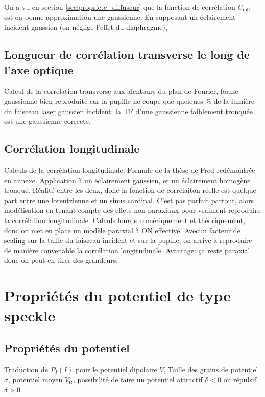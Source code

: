On a vu en section \ref{sec:propriete_diffuseur} que la fonction de corrélation $C_{\mathrm{diff}}$ est en bonne approximation une gaussienne. En supposant un éclairement incident gaussien (on néglige l'effet du diaphragme), 

\subsection{Longueur de corrélation transverse le long de l'axe optique}
Calcul de la corrélation transverse aux alentours du plan de Fourier, forme gaussienne bien reproduite car la pupille ne coupe que quelques \% de la lumière du faisceau laser gaussien incident: la TF d'une gaussienne faiblement tronquée est une gaussienne correcte.

\subsection{Corrélation longitudinale}
Calculs de la corrélation longitudinale. Formule de la thèse de Fred redémontrée en annexe. Application à un éclairement gaussien, et un éclairement homogène tronqué. Réalité entre les deux, donc la fonction de corrélaiton réelle est quelque part entre une lorentzienne et un sinus cardinal. C'est pas parfait partout, alors modélisation en tenant compte des effets non-paraxiaux pour vraiment reproduire la corrélation longitudinale. Calculs lourds numériquement et théoriquement, donc on met en place un modèle paraxial à ON effective. Avecun facteur de scaling sur la taille du faisceau incident et sur la pupille, on arrive à reproduire de manière convenable la corrélation longitudinale. Avantage: ça reste paraxial donc on peut en tirer des grandeurs. 

\section{Propriétés du potentiel de type speckle}
\subsection{Propriétés du potentiel}
Traduction de $P_I(I)$ pour le potentiel dipolaire $V$, Taille des grains de potentiel $\sigma$, potentiel moyen $V_{\mathrm{R}}$, possibilité de faire un potentiel attractif $\delta <0$ ou répulsif $\delta > 0$
